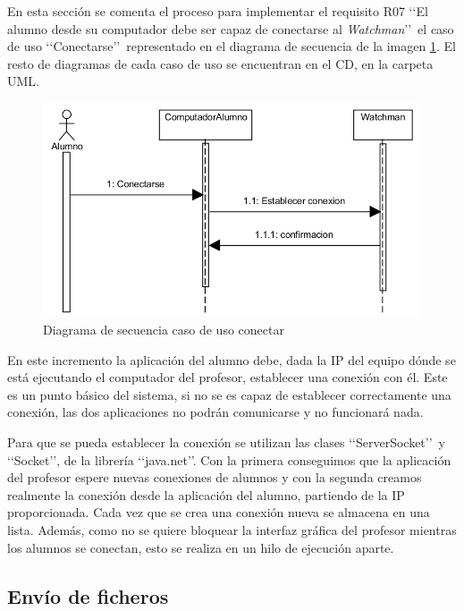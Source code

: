 En esta sección se comenta el proceso para implementar el requisito R07 \lq \lq El alumno desde su computador debe ser capaz de conectarse al \emph{Watchman}\rq \rq \ el caso de uso \lq \lq Conectarse\rq \rq \ representado en el diagrama de secuencia de la imagen \ref{fig:iteracion1:casosUso}. El resto de diagramas de cada caso de uso se encuentran en el CD, en la carpeta UML.
\newline

\begin{figure}
    \centering
    \includegraphics[width=.90\linewidth]{iteracion1/secConectar}
    \caption{Diagrama de secuencia caso de uso conectar}
    \label{fig:iteracion1:casosUso}
\end{figure}

En este incremento la aplicación del alumno debe, dada la IP del equipo dónde se está ejecutando el computador del profesor, establecer una conexión con él. Este es un punto básico del sistema, si no se es capaz de establecer correctamente una conexión, las dos aplicaciones no podrán comunicarse y no funcionará nada.
\newline

Para que se pueda establecer la conexión se utilizan las clases \lq \lq ServerSocket\rq \rq \  y \lq \lq Socket\rq \rq, de la librería \lq \lq java.net\rq \rq\cite{JAVA:1998, JAVANET:2010}. Con la primera conseguimos que la aplicación del profesor espere nuevas conexiones de alumnos y con la segunda creamos realmente la conexión desde la aplicación del alumno, partiendo de la IP proporcionada. Cada vez que se crea una conexión nueva se almacena en una lista. Además, como no se quiere bloquear la interfaz gráfica\cite{GUI:1999} del profesor mientras los alumnos se conectan, esto se realiza en un hilo de ejecución\cite{THREAD:2004} aparte.


\subsection{Envío de ficheros}
\label{sec:iteracion1:envio}

